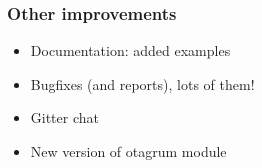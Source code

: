 \documentclass{beamer}
\begin{document}
\begin{frame}
\frametitle{Other improvements}


\begin{itemize}
\item Documentation: added examples
\item Bugfixes (and reports), lots of them!
\item Gitter chat
\item New version of otagrum module
\end{itemize}

% 

\end{frame}



% 
% 
% 
% 
% 

\end{document}
